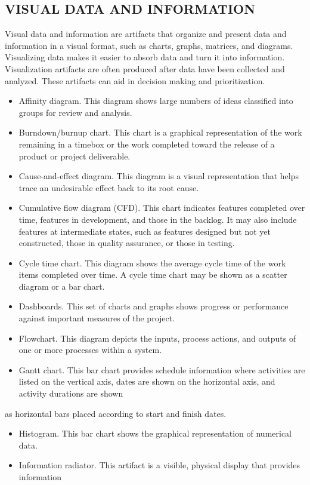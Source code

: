\documentclass[11pt]{article}
\begin{document}
\subsection{VISUAL DATA AND INFORMATION}
\label{sec:org800ab99}
Visual data and information are artifacts that organize and present data and information in a visual format, such as charts, graphs, matrices, and diagrams. Visualizing data makes it easier to absorb data and turn it into information. Visualization artifacts are often produced after data have been collected and analyzed. These artifacts can aid in decision making and prioritization.
\begin{itemize}
\item Affinity diagram. This diagram shows large numbers of ideas classified into groups for review and analysis.
\item Burndown/burnup chart. This chart is a graphical representation of the work remaining in a timebox or the work completed toward the release of a product or project deliverable.
\item Cause-and-effect diagram. This diagram is a visual representation that helps trace an undesirable effect back to its root cause.
\item Cumulative flow diagram (CFD). This chart indicates features completed over time, features in development, and those in the backlog. It may also include features at intermediate states, such as features designed but not yet constructed, those in quality assurance, or those in testing.
\item Cycle time chart. This diagram shows the average cycle time of the work items completed over time. A cycle time chart may be shown as a scatter diagram or a bar chart.
\item Dashboards. This set of charts and graphs shows progress or performance against important measures of the project.
\item Flowchart. This diagram depicts the inputs, process actions, and outputs of one or more processes within a system.
\item Gantt chart. This bar chart provides schedule information where activities are listed on the vertical axis, dates are shown on the horizontal axis, and activity durations are shown
\end{itemize}
as horizontal bars placed according to start and finish dates.
\begin{itemize}
\item Histogram. This bar chart shows the graphical representation of numerical data.
\item Information radiator. This artifact is a visible, physical display that provides information
\end{itemize}
\end{document}
